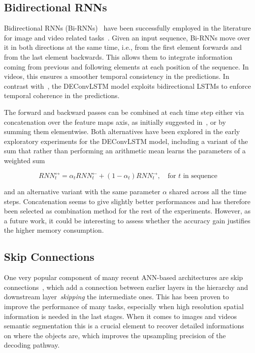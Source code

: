 \subsection{Bidirectional RNNs}
Bidirectional RNNs (Bi-RNNs)~\cite{Schuster1997bidirecrnn} have been
successfully employed in the literature for image and video related
tasks~\cite{Graves+Schmidhuber-2009,visin2015renet,Du2015_CVPR,
Visin_2016_CVPR_Workshops}. Given an input sequence, Bi-RNNs move over it in
both directions at the same time, i.e., from the first element forwards and
from the last element backwards. This allows them to integrate information
coming from previous and following elements at each position of the sequence.
In videos, this ensures a smoother temporal consistency in the predictions. In
contrast with~\cite{ShiCWYWW15}, the DEConvLSTM model exploits bidirectional
LSTMs to enforce temporal coherence in the predictions.

The forward and backward passes can be combined at each time step either via
concatenation over the feature maps axis, as initially suggested in~\cite{
Schuster1997bidirecrnn}, or by summing them elementwise. Both alternatives have
been explored in the early exploratory experiments for the DEConvLSTM model,
including a variant of the sum that rather than performing an arithmetic mean
learns the parameters of a weighted sum

\begin{equation}
    RNN_t^{\leftrightarrow} = \alpha_t RNN_t^{\leftarrow} +
        (1 - \alpha_t) RNN_t^{\rightarrow}, \quad\text{for $t$ in sequence}
\end{equation}

\noindent and an alternative variant with the same parameter $\alpha$ shared
across all the time steps. Concatenation seems to give slightly better
performances and has therefore been selected as combination method for the
rest of the experiments. However, as a future work, it could be interesting to
assess whether the accuracy gain justifies the higher memory consumption.


\subsection{Skip Connections}
One very popular component of many recent ANN-based architectures are skip
connections~\citep[see e.g.,~][]{sermanet-cvpr-13,liu2015parsenet,
long2015fully,Srivastava-et-al-arxiv2015,bell2015inside,he2015deep,
hariharan2015hypercolumns}, which add a connection between earlier layers in
the hierarchy and downstream layer~\emph{skipping} the intermediate ones. This
has been proven to improve the performance of many tasks, especially when
high resolution spatial information is needed in the last stages. When it comes
to images and videos semantic segmentation this is a crucial element to recover
detailed informations on where the objects are, which improves the upsampling
precision of the decoding pathway.

